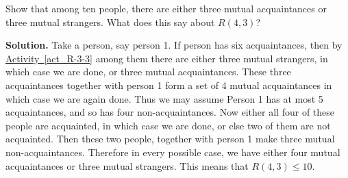 \documentclass{book}
\begin{document}
\setcounter{project}{49}
\addtocounter{project}{-1}
\begin{activity}[]\label{activity-42}
\hypertarget{p-427}{}%
Show that among ten people, there are either three mutual acquaintances or three mutual strangers.  What does this say about \(R(4,3)\)?%
\par\smallskip%
\noindent\textbf{Solution.}\hypertarget{solution-37}{}\quad%
\hypertarget{p-428}{}%
Take a person, say person 1. If person has six acquaintances, then by \hyperref[act_R-3-3]{Activity~\ref{act_R-3-3}} among them there are either three mutual strangers, in which case we are done, or three mutual acquaintances. These three acquaintances together with person 1 form a set of 4 mutual acquaintances in which case we are again done. Thus we may assume Person 1 has at most 5 acquaintances, and so has four non-acquaintances. Now either all four of these people are acquainted, in which case we are done, or else two of them are not acquainted. Then these two people, together with person 1 make three mutual non-acquaintances. Therefore in every possible case, we have either four mutual acquaintances or three mutual strangers. This means that \(R(4,3) \le 10\).%
\end{activity}

\clearpage
\end{document}
